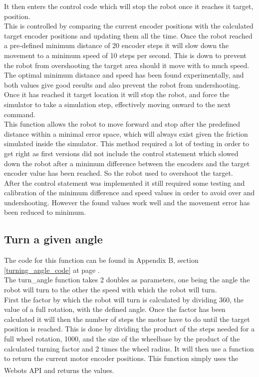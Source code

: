 It then enters the control code which will stop the robot once it reaches it target, position. \\
This is controlled by comparing the current encoder positions with the calculated target encoder positions and updating them all the time. 
Once the robot reached a pre-defined minimum distance of 20 encoder steps it will slow down the movement to a minimum speed of 10 steps per second. This is down to prevent the robot from overshooting the target area should it move with to much speed. The optimal minimum distance and speed has been found experimentally, and both values give good results and also prevent the robot from undershooting.
Once it has reached it target location it will stop the robot, and force the simulator to take a simulation step, effectively moving onward to the next command.\\[3ex]

This function allows the robot to move forward and stop after the predefined distance within a minimal error space, which will always exist given the friction simulated inside the simulator. This method required a lot of testing in order to get right as first versions did not include the control statement which slowed down the robot after a minimum difference between the encoders and the target encoder value has been reached. So the robot used to overshoot the target. \\
After the control statement was implemented it still required some testing and calibration of the minimum difference and speed values in order to avoid over and undershooting. However the found values work well and the movement error has been reduced to minimum.\\

\subsection{Turn a given angle}
\label{turn_angle_description}
The code for this function can be found in Appendix B, section \ref{turning_angle_code} at page \pageref{turning_angle_code}.\\
The turn\_angle function takes 2 doubles as parameters, one being the angle the robot will turn to the other the speed with which the robot will turn.\\
First the factor by which the robot will turn is calculated by dividing 360, the value of a full rotation, with the defined angle.
Once the factor has been calculated it will then the number of steps the motor have to do until the target position is reached. This is done by dividing the product of the steps needed for a full wheel rotation, 1000, and the size of the wheelbase by the product of the calculated turning factor and 2 times the wheel radius. It will then use a function to return the current motor encoder positions. This function simply uses the Webots\textsuperscript{\texttrademark}  API and returns the values. \\[3ex]

